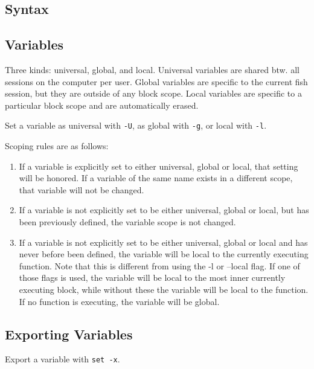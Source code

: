 \documentclass[10pt]{extarticle}
\begin{document}
\begin{paracol}{2}

\section*{Syntax}

\subsection*{Variables}

Three kinds: universal, global, and local. Universal variables are shared btw.
all sessions on the computer per user. Global variables are specific to the
current fish session, but they are outside of any block scope. Local variables
are specific to a particular block scope and are automatically erased.

Set a variable as universal with \texttt{-U}, as global with \texttt{-g}, or
local with \texttt{-l}.

Scoping rules are as follows:

\begin{enumerate}

\item If a variable is explicitly set to either universal, global or local, that
setting will be honored. If a variable of the same name exists in a different
scope, that variable will not be changed.

\item If a variable is not explicitly set to be either universal, global or
local, but has been previously defined, the variable scope is not changed.

\item If a variable is not explicitly set to be either universal, global or
local and has never before been defined, the variable will be local to the
currently executing function. Note that this is different from using the -l or
–local flag. If one of those flags is used, the variable will be local to the
most inner currently executing block, while without these the variable will be
local to the function. If no function is executing, the variable will be global.

\end{enumerate}

\subsection*{Exporting Variables}
Export a variable with \texttt{set -x}.


\end{paracol}
\end{document}
